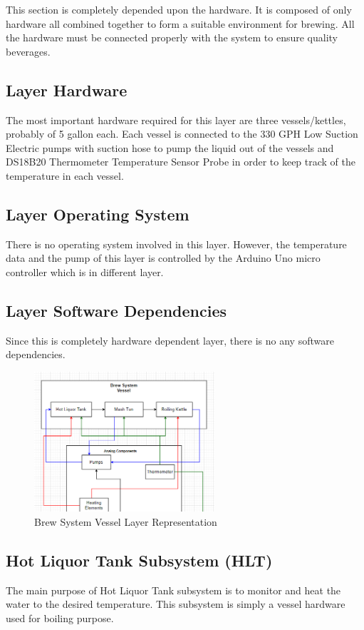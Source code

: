 This section is completely depended upon the hardware. It is composed of only hardware all combined together to form a suitable environment for brewing. All the hardware must be connected properly with the system to ensure quality beverages. 

\subsection{Layer Hardware}
The most important hardware required for this layer are three vessels/kettles, probably of 5 gallon each. Each vessel is connected to the 330 GPH Low Suction Electric pumps with suction hose to pump the liquid out of the vessels and DS18B20 Thermometer Temperature Sensor Probe in order to keep track of the temperature in each vessel.

\subsection{Layer Operating System}
There is no operating system involved in this layer. However, the temperature data and the pump of this layer is controlled by the Arduino Uno micro controller which is in different layer. 

\subsection{Layer Software Dependencies}
Since this is completely hardware dependent layer, there is no any software dependencies.
\newline

\begin{figure}[h!]
	\centering
	\includegraphics[width=0.60\textwidth]{images/Brew_System_Vessels}
	\caption{Brew System Vessel Layer Representation}
\end{figure}

\subsection{Hot Liquor Tank Subsystem (HLT)}
The main purpose of Hot Liquor Tank subsystem is to monitor and heat the water to the desired temperature. This subsystem is simply a vessel hardware used for boiling purpose.

